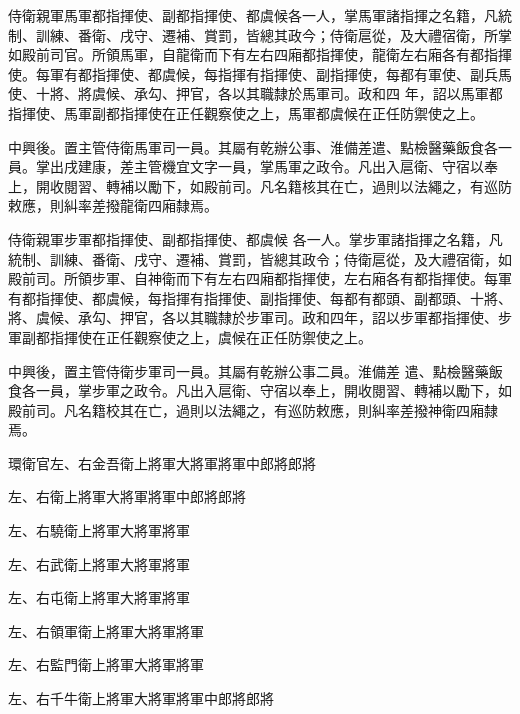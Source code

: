 \begin{pinyinscope}
 侍衛親軍馬軍都指揮使、副都指揮使、都虞候各一人，掌馬軍諸指揮之名籍，凡統制、訓練、番衛、戌守、遷補、賞罰，皆總其政今；侍衛扈從，及大禮宿衛，所掌如殿前司官。所領馬軍，自龍衛而下有左右四廂都指揮使，龍衛左右廂各有都指揮使。每軍有都指揮使、都虞候，每指揮有指揮使、副指揮使，每都有軍使、副兵馬使、十將、將虞候、承勾、押官，各以其職隸於馬軍司。政和四
 年，詔以馬軍都指揮使、馬軍副都指揮使在正任觀察使之上，馬軍都虞候在正任防禦使之上。



 中興後。置主管侍衛馬軍司一員。其屬有乾辦公事、淮備差遣、點檢醫藥飯食各一員。掌出戌建康，差主管機宜文字一員，掌馬軍之政令。凡出入扈衛、守宿以奉上，開收閱習、轉補以勵下，如殿前司。凡名籍核其在亡，過則以法繩之，有巡防敕應，則糾率差撥龍衛四廂隸焉。



 侍衛親軍步軍都指揮使、副都指揮使、都虞候
 各一人。掌步軍諸指揮之名籍，凡統制、訓練、番衛、戌守、遷補、賞罰，皆總其政令；侍衛扈從，及大禮宿衛，如殿前司。所領步軍、自神衛而下有左右四廂都指揮使，左右廂各有都指揮使。每軍有都指揮使、都虞候，每指揮有指揮使、副指揮使、每都有都頭、副都頭、十將、將、虞候、承勾、押官，各以其職隸於步軍司。政和四年，詔以步軍都指揮使、步軍副都指揮使在正任觀察使之上，虞候在正任防禦使之上。



 中興後，置主管侍衛步軍司一員。其屬有乾辦公事二員。淮備差
 遣、點檢醫藥飯食各一員，掌步軍之政令。凡出入扈衛、守宿以奉上，開收閱習、轉補以勵下，如殿前司。凡名籍校其在亡，過則以法繩之，有巡防敕應，則糾率差撥神衛四廂隸焉。



 環衛官左、右金吾衛上將軍大將軍將軍中郎將郎將



 左、右衛上將軍大將軍將軍中郎將郎將



 左、右驍衛上將軍大將軍將軍



 左、右武衛上將軍大將軍將軍



 左、右屯衛上將軍大將軍將軍



 左、右領軍衛上將軍大將軍將軍



 左、右監門衛上將軍大將軍將軍



 左、右千牛衛上將軍大將軍將軍中郎將郎將




\end{pinyinscope}
